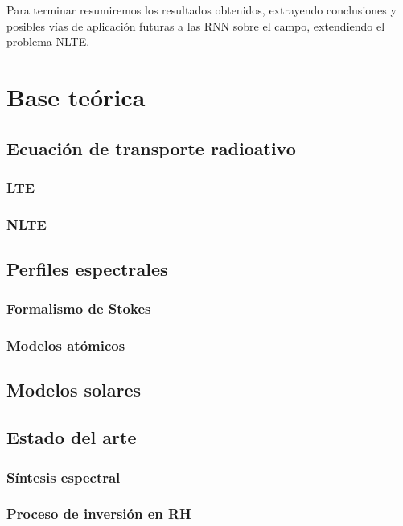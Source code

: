 \documentclass[8pt]{article}
\begin{document}
	Para terminar resumiremos los resultados obtenidos, extrayendo conclusiones y posibles vías de aplicación futuras a las RNN sobre el campo, extendiendo el problema NLTE.	
	
		
		\section{Base teórica}
		
			\subsection{Ecuación de transporte radioativo}
				
				\subsubsection{LTE}
				
				\subsubsection{NLTE}
		
		\subsection{Perfiles espectrales}
		
			\subsubsection{Formalismo de Stokes}
			
			\subsubsection{Modelos atómicos}

		\subsection{Modelos solares}
		
		
		\subsection{Estado del arte}
		
			\subsubsection{Síntesis espectral}
		
			\subsubsection{Proceso de inversión en RH}
	
\end{document}
